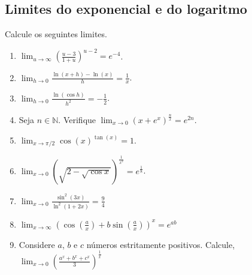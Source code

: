 \documentclass[latin,20pt]{article}
\begin{document}
   \subsection{Limites do exponencial e do logaritmo}   
   Calcule os seguintes limites.  
    \begin{enumerate}
    \item $\lim_{u \rightarrow \infty} 
    \left(\frac{u-3}{1+u}\right)^{u-2}=e^{-4}$.
    \item $\lim_{h \rightarrow 0} 
    \frac{\ln(x+h)-\ln(x)}{h}=\frac{1}{x}$.
    \item $\lim_{h \rightarrow 0} 
    \frac{\ln(\cos h)}{h^2}=-\frac{1}{2}$.
    \item Seja $n \in \mathbb{N}$. Verifique $\lim_{x \rightarrow 0} 
    \left(x+e^{x}\right)^{\frac{n}{x}}=e^{2n}$.
    \item $\lim_{x \rightarrow \pi/2} 
    \cos(x)^{\tan(x)}=1$.
    \item $\lim_{x \rightarrow 0} 
    \left(\sqrt{2-\sqrt{\cos x}}\right)^{\frac{1}{x^2}}=e^{\frac{1}{8}}$.
     \item $\lim_{x \rightarrow 0} 
    \frac{\sin^{2}(3x)}{\ln^{2}(1+2x)}=\frac{9}{4}$
   \item $\lim_{x \rightarrow \infty} 
    \left(\cos(\frac{a}{x})+b\sin(\frac{a}{x})\right)^{x}=e^{ab}$
    \item Considere $a$, $b$ e $c$ números estritamente positivos. Calcule, $\lim_{x \rightarrow 0} 
    \left(\frac{a^x+b^x+c^x}{3}\right)^{\frac{1}{x}}$
    \end{enumerate}    
\end{document}
